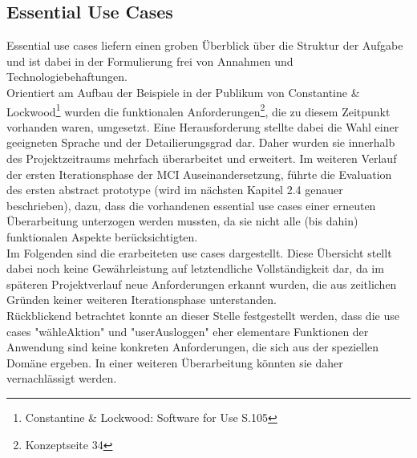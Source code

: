 \newpage
\subsection{Essential Use Cases}
Essential use cases liefern einen groben Überblick über die Struktur der Aufgabe und ist dabei in der Formulierung frei von Annahmen und Technologiebehaftungen.\\
Orientiert am Aufbau der Beispiele in der Publikum von Constantine \& Lockwood\footnote{Constantine \& Lockwood: Software for Use S.105} wurden die funktionalen Anforderungen\footnote{Konzeptseite 34}, die zu diesem Zeitpunkt vorhanden waren, umgesetzt.
Eine Herausforderung stellte dabei die Wahl einer geeigneten Sprache und der Detailierungsgrad dar. Daher wurden sie innerhalb des Projektzeitraums mehrfach überarbeitet und erweitert. Im weiteren Verlauf der ersten Iterationsphase der MCI Auseinandersetzung, führte die Evaluation des ersten abstract prototype (wird im nächsten Kapitel 2.4 genauer beschrieben), dazu, dass die vorhandenen essential use cases einer erneuten Überarbeitung unterzogen werden mussten, da sie nicht alle (bis dahin) funktionalen Aspekte berücksichtigten.\\

Im Folgenden sind die erarbeiteten use cases dargestellt. Diese Übersicht stellt dabei noch keine Gewährleistung auf letztendliche Vollständigkeit dar, da im späteren Projektverlauf neue Anforderungen erkannt wurden, die aus zeitlichen Gründen keiner weiteren Iterationsphase unterstanden.\\ 
Rückblickend betrachtet konnte an dieser Stelle festgestellt werden, dass die use cases "wähleAktion" und "userAusloggen" eher elementare Funktionen der Anwendung sind keine konkreten Anforderungen, die sich aus der speziellen Domäne ergeben. In einer weiteren Überarbeitung könnten sie daher vernachlässigt werden.

